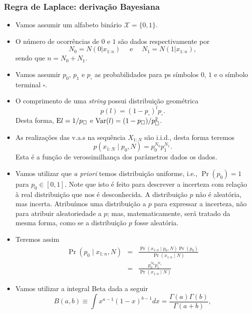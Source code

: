 \begin{frame}[allowframebreaks]
  \frametitle{Regra de Laplace: derivação Bayesiana}
  \begin{itemize}
  \item Vamos assumir um alfabeto binário $\mathcal{X} = \{0,1\}$.
  \item O número de ocorrências de $0$ e $1$ são dados respectivamente por
	\begin{equation}
	N_0 = N(0|x_{1:n}) \quad \text{ e } \quad N_1 = N(1|x_{1:n}) ,
	\end{equation}	
	sendo que $n=N_0 + N_1$.
  \item Vamos assumir $p_0$, $p_1$ e $p_\square$ as probabilidades para ps símbolos $0$, $1$ e o símbolo terminal $\square$.
  \item O comprimento de uma \textit{string} possui distribuição geométrica
	\begin{equation}
	p(l) = (1 - p_\square)^l p_\square .
	\end{equation}
	Desta forma, $\mathrm{E} l = 1/p_\square$ e $\mathrm{Var}(l) = (1 - p_\square)/p^2_\square$.
  \item As realizações das v.a.s na sequência $X_{1:N}$ são i.i.d.,  desta forma teremos
	\begin{equation}
	p(x_{1:N} \mid p_0, N) = p_0^{N_0} p_1^{N_1} .
	\end{equation}
	Esta é a função de verossimilhança dos parâmetros dados os dados.
  \item Vamos utilizar que \emph{a priori} temos distribuição uniforme, i.e., $\Pr(p_0) = 1$ para $p_0 \in [0,1]$.
	Note que isto é feito para descrever a incerteza com relação à real distribuição que nos é desconhecida.
	A distribuição $p$ não é aleatória, mas incerta. Atribuímos uma distribuição a $p$ para expressar a
	incerteza, não para atribuir aleatoriedade a $p$; mas, matematicamente, será tratado da mesma forma,
	como se a distribuição $p$ fosse aleatória. 
  \item Teremos assim
	\begin{eqnarray}
	\Pr(p_0 \mid x_{1:n}, N) &=& \frac{ \Pr(x_{1:n} \mid p_0, N) \Pr(p_0) }{ \Pr (x_{1:n} \mid N) } \nonumber \\
		&=& \frac{ p_0^{N_0} p_1^{N_1} }{ \Pr (x_{1:n} \mid N) }
	\end{eqnarray}
  \item Vamos utilizar a integral Beta dada a seguir
	\begin{equation}
	B(a,b) \equiv \int x^{a-1} (1-x)^{b-1} dx = \frac{ \Gamma(a) \Gamma(b)}{ \Gamma(a+b)} ,

\end{equation}
\end{itemize}
\end{frame}
